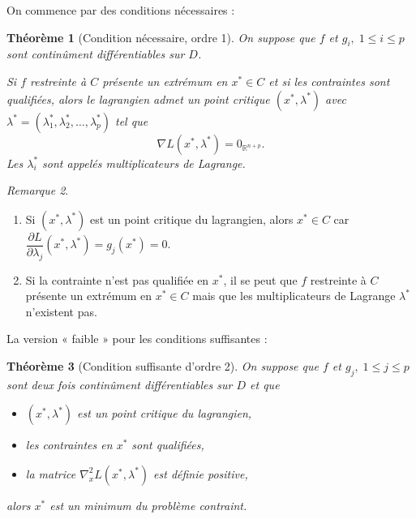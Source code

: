 \documentclass[a4paper,12pt,openany]{book}
\theoremstyle{plain}
\newtheorem{theorem}{Théorème}[section]
\theoremstyle{definition}
\theoremstyle{remark}
\newtheorem{remark}[theorem]{Remarque}
\theoremstyle{nbstyle}
\begin{document}
	On commence par des conditions nécessaires :
	
	\begin{theorem}[Condition nécessaire, ordre 1]
		On suppose que \(f\) et \(g_i,\;1\le i\le p\) sont continûment différentiables sur \(D\).
		
		Si \(f\) restreinte à \(C\) présente un extrémum en \(x^*\in C\) et si les contraintes sont qualifiées,
		alors le lagrangien admet un point critique \((x^*,\lambda^*)\) avec \(\lambda^*=(\lambda^*_1,\lambda^*_2,\dots,\lambda^*_p)\) tel que
		\[
		\nabla L(x^*,\lambda^*)=0_{\mathbb{R}^{n+p}}.
		\]
		Les \(\lambda^*_i\) sont appelés multiplicateurs de Lagrange.
	\end{theorem}
	
	\begin{remark}
		\begin{enumerate}
			\item Si \((x^*,\lambda^*)\) est un point critique du lagrangien, alors \(x^*\in C\) car \(\dfrac{\partial L}{\partial \lambda_j}(x^*,\lambda^*)=g_j(x^*)=0\).
			\item Si la contrainte n'est pas qualifiée en \(x^*\), il se peut que \(f\) restreinte à \(C\) présente un extrémum en \(x^*\in C\) mais que les multiplicateurs de Lagrange \(\lambda^*\) n'existent pas.
		\end{enumerate}
	\end{remark}
	
	La version « faible » pour les conditions suffisantes :
	
	\begin{theorem}[Condition suffisante d'ordre 2]
		On suppose que \(f\) et \(g_j,\;1\le j\le p\) sont deux fois continûment différentiables sur \(D\) et que
		\begin{itemize}
			\item \((x^*,\lambda^*)\) est un point critique du lagrangien,
			\item les contraintes en \(x^*\) sont qualifiées,
			\item la matrice \(\nabla^2_x L(x^*,\lambda^*)\) est définie positive,
		\end{itemize}
		alors \(x^*\) est un minimum du problème contraint.
	\end{theorem}
	
\end{document}
